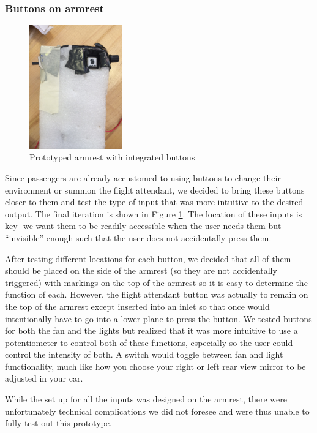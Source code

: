 \subsubsection{Buttons on armrest}

\begin{figure}[h]
  \centering
     \includegraphics[width=4cm]{images/FoamArmrest.jpg}
   \caption{ Prototyped armrest with integrated buttons}
  \label{fig:FoamArmrest.jpg}
\end{figure}

Since passengers are already accustomed to using buttons to change their environment or summon the flight attendant, we decided to bring these buttons closer to them and test the type of input that was more intuitive to the desired output. The final iteration is shown in  Figure \ref{fig:FoamArmrest.jpg}. The location of these inputs is key- we want them to be readily accessible when the user needs them but “invisible” enough such that the user does not accidentally press them. 

After testing different locations for each button, we decided that all of them should be placed on the side of the armrest (so they are not accidentally triggered) with markings on the top of the armrest so it is easy to determine the function of each. However, the flight attendant button was actually to remain on the top of the armrest except inserted into an inlet so that once would intentionally have to go into a lower plane to press the button. We tested buttons for both the fan and the lights but realized that it was more intuitive to use a potentiometer to control both of these functions, especially so the user could control the intensity of both. A switch would toggle between fan and light functionality, much like how you choose your right or left rear view mirror to be adjusted in your car.  

While the set up for all the inputs was designed on the armrest, there were unfortunately technical complications we did not foresee and were thus unable to fully test out this prototype. 

